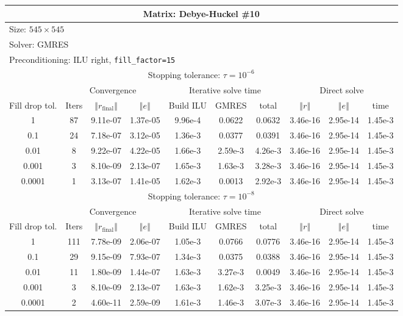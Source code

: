 \documentclass[oneside,final]{amsart}  %
\begin{document}
\begin{tabular}{|c|c|c|c|c|c|c|c|c|c|}
\hline
\multicolumn{10}{|c|}{Matrix: Debye-Huckel \#10}\tabularnewline
\hline
  \multicolumn{10}{|l|}{Size: $545\times545$}\tabularnewline
\hline
\multicolumn{10}{|l|}{Solver: GMRES}\tabularnewline
\hline
\multicolumn{10}{|l|}{Preconditioning: ILU right, \texttt{fill\_factor=15}}\tabularnewline
\hline
\hline
\multicolumn{10}{|c|}{Stopping tolerance: $\tau=10^{-6}$}\tabularnewline
\hline
\hline
 & \multicolumn{3}{c|}{Convergence} & \multicolumn{3}{c|}{Iterative solve time} & \multicolumn{3}{c|}{Direct solve}\tabularnewline
\hline
Fill drop tol.  & Iters & $\left\Vert r_{\text{final}}\right\Vert $  & $\left\Vert e\right\Vert $  & Build ILU  & GMRES  & total  & $\left\Vert r\right\Vert $ & $\left\Vert e\right\Vert $  & time\tabularnewline
\hline
1      & 87  & 9.11e-07 & 1.37e-05 & 9.96e-4 &  0.0622 &  0.0632 & 3.46e-16 & 2.95e-14 &   1.45e-3\\
  \hline
0.1    & 24  & 7.18e-07 & 3.12e-05 & 1.36e-3 &  0.0377 &  0.0391 & 3.46e-16 & 2.95e-14 &   1.45e-3\\
  \hline
0.01   & 8   & 9.22e-07 & 4.22e-05 & 1.66e-3 & 2.59e-3 & 4.26e-3 & 3.46e-16 & 2.95e-14 &   1.45e-3\\
  \hline
0.001  & 3   & 8.10e-09 & 2.13e-07 & 1.65e-3 & 1.63e-3 & 3.28e-3 & 3.46e-16 & 2.95e-14 &   1.45e-3\\
  \hline
0.0001 & 1   & 3.13e-07 & 1.41e-05 & 1.62e-3 &  0.0013 & 2.92e-3 & 3.46e-16 & 2.95e-14 &   1.45e-3\\
  \hline
\hline
\multicolumn{10}{|c|}{Stopping tolerance: $\tau=10^{-8}$}\tabularnewline
\hline
\hline
 & \multicolumn{3}{c|}{Convergence} & \multicolumn{3}{c|}{Iterative solve time} & \multicolumn{3}{c|}{Direct solve }\tabularnewline
\hline
Fill drop tol.  & Iters  & $\left\Vert r_{\text{final}}\right\Vert $  & $\left\Vert e\right\Vert $ & Build ILU  & GMRES  & total  & $\left\Vert r\right\Vert $  & $\left\Vert e\right\Vert $  & time\tabularnewline
\hline
1      & 111 & 7.78e-09 & 2.06e-07 & 1.05e-3 &  0.0766 &  0.0776 & 3.46e-16 & 2.95e-14 &   1.45e-3\\
  \hline
0.1    & 29  & 9.15e-09 & 7.93e-07 & 1.34e-3 &  0.0375 &  0.0388 & 3.46e-16 & 2.95e-14 &   1.45e-3\\
  \hline
0.01   & 11  & 1.80e-09 & 1.44e-07 & 1.63e-3 & 3.27e-3 &  0.0049 & 3.46e-16 & 2.95e-14 &   1.45e-3\\
  \hline
0.001  & 3   & 8.10e-09 & 2.13e-07 & 1.63e-3 & 1.62e-3 & 3.25e-3 & 3.46e-16 & 2.95e-14 &   1.45e-3\\
  \hline
0.0001 & 2   & 4.60e-11 & 2.59e-09 & 1.61e-3 & 1.46e-3 & 3.07e-3 & 3.46e-16 & 2.95e-14 &   1.45e-3\\
  \hline
\end{tabular}
\end{document}

